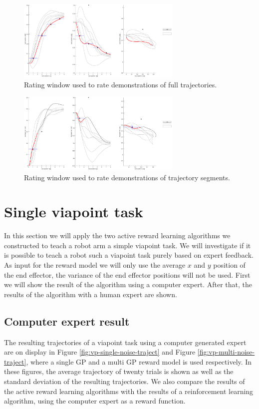 \documentclass[mscThesis.tex]{subfiles}
\begin{document}
\begin{figure}[!htb]
    \centering
    \includegraphics[width=0.7\textwidth, keepaspectratio=1]{figures/gui-single}
    \caption{Rating window used to rate demonstrations of full trajectories.}
    \label{fig:gui-expert-single}
\end{figure}%
    
\begin{figure}[!htb]
    \centering
    \includegraphics[width=0.7\textwidth, keepaspectratio=1]{figures/gui-multi}
    \caption{Rating window used to rate demonstrations of trajectory segments.}
    \label{fig:gui-expert-multi}
\end{figure}

\section{Single viapoint task}
\label{sec:vp}

In this section we will apply the two active reward learning algorithms we constructed to teach a robot arm a simple viapoint task. We will investigate if it is possible to teach a robot such a viapoint task purely based on expert feedback. As input for the reward model we will only use the average $x$ and $y$ position of the end effector, the variance of the end effector positions will not be used. First we will show the result of the algorithm using a computer expert. After that, the results of the algorithm with a human expert are shown. 

\subsection{Computer expert result}
The resulting trajectories of a viapoint task using a computer generated expert are on display in Figure \ref{fig:vp-single-noise-traject} and Figure \ref{fig:vp-multi-noise-traject}, where a single GP and a multi GP reward model is used respectively. In these figures, the average trajectory of twenty trials is shown as well as the standard deviation of the resulting trajectories. We also compare the results of the active reward learning algorithms with the results of a reinforcement learning algorithm, using the computer expert as a reward function. 
\end{document}
